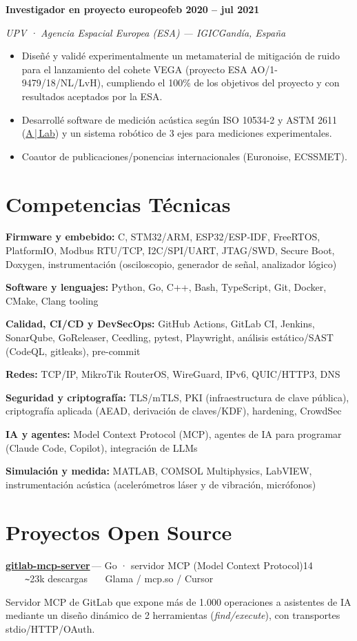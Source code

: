 \documentclass[11pt,a4paper]{article}
\let\jmrpsection\section
\renewcommand{\section}[1]{\needspace{4\baselineskip}\jmrpsection{#1}}
\newcommand{\cventry}[4]{%
  \textbf{#1}\hfill\textbf{#4}\par
  {\color{muted}\textit{#2}\hfill\textit{#3}}\par
  \vspace{2pt}
}
\newcommand{\cvproject}[3]{%
  \textbf{#1}\,\textcolor{muted}{\small— #2}\hfill{\small\textcolor{accent}{#3}}\par
  \vspace{1pt}
}
\newcommand{\cvskill}[2]{\textbf{#1:} #2\par\vspace{2pt}}
\newcommand{\divider}{\textcolor{muted}{\ \raisebox{0.4ex}{\scriptsize$\bullet$}\ }}
\begin{document}
\cventry{Investigador en proyecto europeo}{UPV · Agencia Espacial Europea (ESA) — IGIC}{Gandía, España}{feb 2020 – jul 2021}
\begin{itemize}
  \item Diseñé y validé experimentalmente un metamaterial de mitigación de ruido para el lanzamiento del cohete VEGA (proyecto ESA AO/1-9479/18/NL/LvH), cumpliendo el 100\% de los objetivos del proyecto y con resultados aceptados por la ESA.
  \item Desarrollé software de medición acústica según ISO 10534-2 y ASTM 2611 (\href{https://github.com/jmrplens/A-Lab}{A\,|\,Lab}) y un sistema robótico de 3 ejes para mediciones experimentales.
  \item Coautor de publicaciones/ponencias internacionales (Euronoise, ECSSMET).
\end{itemize}\vspace{2pt}

\section{Competencias Técnicas}
\cvskill{Firmware y embebido}{C, STM32/ARM, ESP32/ESP-IDF, FreeRTOS, PlatformIO, Modbus RTU/TCP, I2C/SPI/UART, JTAG/SWD, Secure Boot, Doxygen, instrumentación (osciloscopio, generador de señal, analizador lógico)}
\cvskill{Software y lenguajes}{Python, Go, C++, Bash, TypeScript, Git, Docker, CMake, Clang tooling}
\cvskill{Calidad, CI/CD y DevSecOps}{GitHub Actions, GitLab CI, Jenkins, SonarQube, GoReleaser, Ceedling, pytest, Playwright, análisis estático/SAST (CodeQL, gitleaks), pre-commit}
\cvskill{Redes}{TCP/IP, MikroTik RouterOS, WireGuard, IPv6, QUIC/HTTP3, DNS}
\cvskill{Seguridad y criptografía}{TLS/mTLS, PKI (infraestructura de clave pública), criptografía aplicada (AEAD, derivación de claves/KDF), hardening, CrowdSec}
\cvskill{IA y agentes}{Model Context Protocol (MCP), agentes de IA para programar (Claude Code, Copilot), integración de LLMs}
\cvskill{Simulación y medida}{MATLAB, COMSOL Multiphysics, LabVIEW, instrumentación acústica (acelerómetros láser y de vibración, micrófonos)}

\section{Proyectos Open Source}
\cvproject{\href{https://github.com/jmrplens/gitlab-mcp-server}{gitlab-mcp-server}}{Go · servidor MCP (Model Context Protocol)}{14\,\faStar \ \divider\ \texttt{\textasciitilde}23k descargas \divider\ Glama / mcp.so / Cursor}
Servidor MCP de GitLab que expone más de 1.000 operaciones a asistentes de IA mediante un diseño dinámico de 2 herramientas (\textit{find/execute}), con transportes stdio/HTTP/OAuth.\par\vspace{4pt}
\end{document}
